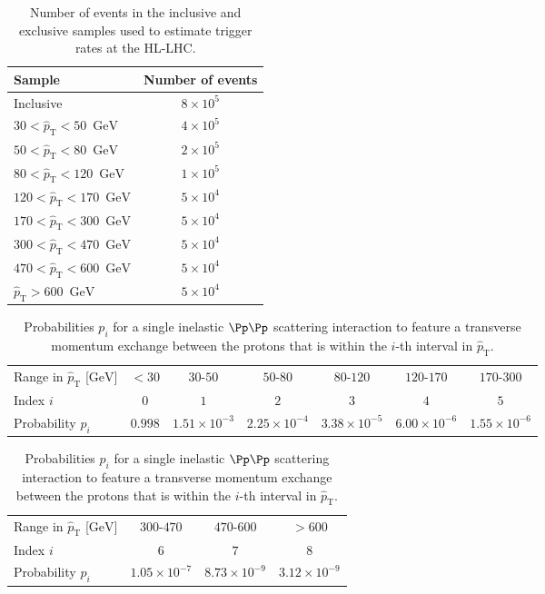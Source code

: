 \documentclass[twocolumn,epjc3]{svjour3}
\newcommand{\pThat}{\ensuremath{\hat{p}_{\textrm{T}}}\xspace}
\newcommand{\GeV}{\ensuremath{\textrm{GeV}}\xspace}
\begin{document}
\begin{table}
\caption{
  Number of events in the inclusive and exclusive samples used to estimate trigger rates at the HL-LHC.
}
\label{tab:samples_trigger_rate}
\begin{center}
\begin{tabular}{l|c}
\hline
Sample                    & Number of events \\
\hline
Inclusive                 & $8 \times 10^{5}$ \\
\hline
$ 30 < \pThat <  50$~\GeV & $4 \times 10^{5}$ \\
$ 50 < \pThat <  80$~\GeV & $2 \times 10^{5}$ \\
$ 80 < \pThat < 120$~\GeV & $1 \times 10^{5}$ \\
$120 < \pThat < 170$~\GeV & $5 \times 10^{4}$ \\
$170 < \pThat < 300$~\GeV & $5 \times 10^{4}$ \\
$300 < \pThat < 470$~\GeV & $5 \times 10^{4}$ \\
$470 < \pThat < 600$~\GeV & $5 \times 10^{4}$ \\
$\pThat > 600$~\GeV       & $5 \times 10^{4}$ \\
\hline
\end{tabular}
\end{center}
\end{table}

\begin{table}
\caption{
  Probabilities $p_{i}$ for a single inelastic $\Pp\Pp$ scattering interaction to feature a transverse momentum exchange 
  between the protons that is within the $i$-th interval in $\pThat$.
}
\label{tab:p_trigger_rate}
\begin{center}
\begin{minipage}{16cm}
\begin{tabular}{l|cccccc}
\hline
Range in $\pThat$ [\GeV] & $< 30$ & $30$-$50$ & $50$-$80$ & $80$-$120$ & $120$-$170$ & $170$-$300$ \\
Index $i$           & $0$ & $1$ & $2$ & $3$ & $4$ & $5$ \\
\hline
\hline
Probability $p_{i}$ & $0.998$ & $1.51 \times 10^{-3}$ & $2.25 \times 10^{-4}$ & $3.38 \times 10^{-5}$ & $6.00 \times 10^{-6}$ & $1.55 \times 10^{-6}$ \\
\hline
\end{tabular}

\vspace{2mm}

\begin{tabular}{l|ccc}
\hline
Range in $\pThat$ [\GeV] & $300$-$470$ & $470$-$600$ & $> 600$ \\
Index $i$           & $6$ & $7$ & $8$ \\
\hline
\hline
Probability $p_{i}$ & $1.05 \times 10^{-7}$ & $8.73 \times 10^{-9}$ & $3.12 \times 10^{-9}$ \\
\hline
\end{tabular}
\end{minipage}
\end{center}
\end{table}
\end{document}
